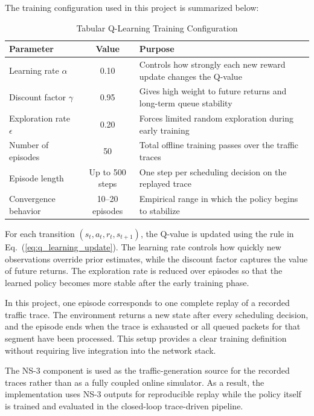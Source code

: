 The training configuration used in this project is summarized below:

\begin{table}[H]
\centering
\small
\begin{tabular}{|l|c|p{6.2cm}|}
\hline
\textbf{Parameter} & \textbf{Value} & \textbf{Purpose} \\ \hline
Learning rate $\alpha$ & 0.10 & Controls how strongly each new reward update changes the Q-value \\ \hline
Discount factor $\gamma$ & 0.95 & Gives high weight to future returns and long-term queue stability \\ \hline
Exploration rate $\epsilon$ & 0.20 & Forces limited random exploration during early training \\ \hline
Number of episodes & 50 & Total offline training passes over the traffic traces \\ \hline
Episode length & Up to 500 steps & One step per scheduling decision on the replayed trace \\ \hline
Convergence behavior & 10--20 episodes & Empirical range in which the policy begins to stabilize \\ \hline
\end{tabular}
\caption{Tabular Q-Learning Training Configuration}
\label{tab:rl_training_config}
\end{table}

For each transition $(s_t,a_t,r_t,s_{t+1})$, the Q-value is updated using the
rule in Eq.~(\ref{eq:q_learning_update}). The learning rate controls how
quickly new observations override prior estimates, while the discount factor
captures the value of future returns. The exploration rate is reduced over
episodes so that the learned policy becomes more stable after the early
training phase.

In this project, one episode corresponds to one complete replay of a recorded
traffic trace. The environment returns a new state after every scheduling
decision, and the episode ends when the trace is exhausted or all queued
packets for that segment have been processed. This setup provides a clear
training definition without requiring live integration into the network
stack.

The NS-3 component is used as the traffic-generation source for the recorded
traces rather than as a fully coupled online simulator. As a result, the
implementation uses NS-3 outputs for reproducible replay while the policy
itself is trained and evaluated in the closed-loop trace-driven pipeline.


